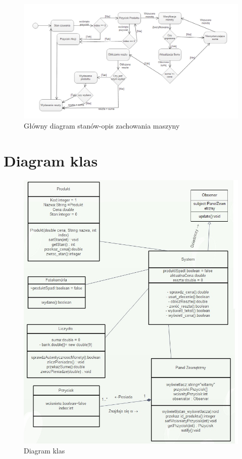 \documentclass[a4paper, 11pt]{article}
\begin{document}
\begin{figure}[H]
\centerline{\includegraphics[scale=0.7]{../Diagrams/StanVending}}
\caption{Główny diagram stanów-opis zachowania maszyny}
\end{figure}

\section{Diagram klas}
\begin{figure}[H]
\centerline{\includegraphics[scale=0.7]{../Diagrams/diagramKlas2}}
\caption{Diagram klas}
\end{figure}
\end{document}
